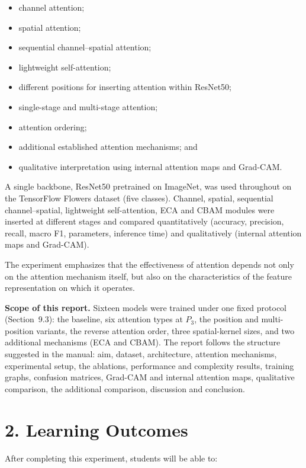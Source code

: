 \documentclass[11pt]{article}
\begin{document}
\begin{itemize}
\item channel attention;
\item spatial attention;
\item sequential channel--spatial attention;
\item lightweight self-attention;
\item different positions for inserting attention within ResNet50;
\item single-stage and multi-stage attention;
\item attention ordering;
\item additional established attention mechanisms; and
\item qualitative interpretation using internal attention maps and Grad-CAM.
\end{itemize}

A single backbone, ResNet50 pretrained on ImageNet, was used throughout on
the TensorFlow Flowers dataset (five classes). Channel, spatial, sequential
channel--spatial, lightweight self-attention, ECA and CBAM modules were
inserted at different stages and compared quantitatively (accuracy,
precision, recall, macro F1, parameters, inference time) and qualitatively
(internal attention maps and Grad-CAM).

The experiment emphasizes that the effectiveness of attention depends not
only on the attention mechanism itself, but also on the characteristics of
the feature representation on which it operates.

\textbf{Scope of this report.} Sixteen models were trained under one fixed
protocol (Section~9.3): the baseline, six attention types at $P_3$, the
position and multi-position variants, the reverse attention order, three
spatial-kernel sizes, and two additional mechanisms (ECA and CBAM). The
report follows the structure suggested in the manual: aim, dataset,
architecture, attention mechanisms, experimental setup, the ablations,
performance and complexity results, training graphs, confusion matrices,
Grad-CAM and internal attention maps, qualitative comparison, the additional
comparison, discussion and conclusion.

\section*{2. Learning Outcomes}

After completing this experiment, students will be able to:
\end{document}
